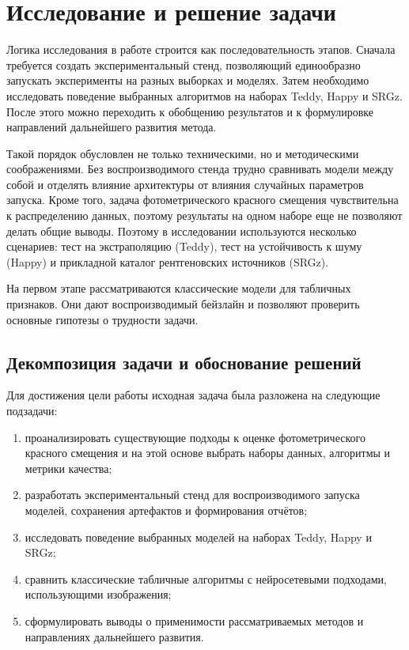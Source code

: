\documentclass[12pt,a4paper]{article}
\begin{document}
\newpage
\section{Исследование и решение задачи}

Логика исследования в работе строится как последовательность этапов. Сначала требуется создать экспериментальный стенд, позволяющий единообразно запускать эксперименты на разных выборках и моделях. Затем необходимо исследовать поведение выбранных алгоритмов на наборах Teddy, Happy и SRGz. После этого можно переходить к обобщению результатов и к формулировке направлений дальнейшего развития метода.

Такой порядок обусловлен не только техническими, но и методическими соображениями. Без воспроизводимого стенда трудно сравнивать модели между собой и отделять влияние архитектуры от влияния случайных параметров запуска. Кроме того, задача фотометрического красного смещения чувствительна к распределению данных, поэтому результаты на одном наборе еще не позволяют делать общие выводы. Поэтому в исследовании используются несколько сценариев: тест на экстраполяцию (Teddy), тест на устойчивость к шуму (Happy) и прикладной каталог рентгеновских источников (SRGz).

На первом этапе рассматриваются классические модели для табличных признаков. Они дают воспроизводимый бейзлайн и позволяют проверить основные гипотезы о трудности задачи.

\subsection{Декомпозиция задачи и обоснование решений}

Для достижения цели работы исходная задача была разложена на следующие подзадачи:
\begin{enumerate}[label=\arabic*.]
    \item проанализировать существующие подходы к оценке фотометрического красного смещения и на этой основе выбрать наборы данных, алгоритмы и метрики качества;
    \item разработать экспериментальный стенд для воспроизводимого запуска моделей, сохранения артефактов и формирования отчётов;
    \item исследовать поведение выбранных моделей на наборах Teddy, Happy и SRGz;
    \item сравнить классические табличные алгоритмы с нейросетевыми подходами, использующими изображения;
    \item сформулировать выводы о применимости рассматриваемых методов и направлениях дальнейшего развития.
\end{enumerate}
\end{document}
